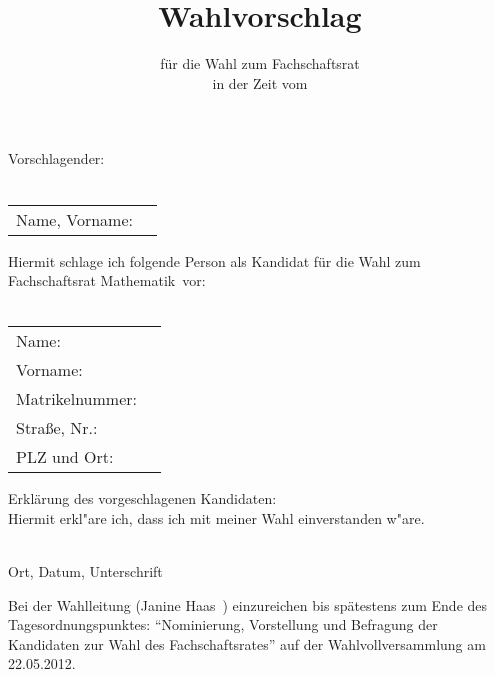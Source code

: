 \documentclass[a4paper,10pt]{scrartcl}
\title{Wahlvorschlag}
\subtitle{für die Wahl zum Fachschaftsrat \fach \\ in der Zeit vom \zeit}
\date{}
\def\fach{Mathematik}
\def\wahlvvDatum{22.05.2012}
\def\wahlleiter{Janine Haas~}
\begin{document}
\pagestyle{empty}
\thispagestyle{empty}
\renewcommand{\titlepagestyle}{empty}

\maketitle

Vorschlagender:
\\
\vspace{0.5cm}\\
\begin{tabularx}{\textwidth}{lX}
Name, Vorname: & \underline{\hspace{10cm}} \vspace{0.5cm}\\
\end{tabularx}
Hiermit schlage ich folgende Person als Kandidat für die Wahl zum Fachschaftsrat \fach~vor:\\
\vspace{0.5cm}\\
\begin{tabularx}{\textwidth}{lX}
Name: & \underline{\hspace{10cm}} \vspace{0.5cm}\\
Vorname:  & \underline{\hspace{10cm}} \vspace{0.5cm}\\
Matrikelnummer: & \underline{\hspace{10cm}} \vspace{0.5cm}\\ 
Straße, Nr.:  & \underline{\hspace{10cm}} \vspace{0.5cm}\\
PLZ und Ort: & \underline{\hspace{10cm}} \vspace{0.5cm}\\
\end{tabularx}          
Erklärung des vorgeschlagenen Kandidaten:\\
Hiermit erkl"are ich, dass ich mit meiner Wahl einverstanden w"are.
\vspace{0.5cm}

\underline{\hspace{10cm}}\\
Ort, Datum, Unterschrift

Bei der Wahlleitung (\wahlleiter) einzureichen bis spätestens zum Ende des Tagesordnungspunktes:
``Nominierung, Vorstellung und Befragung der Kandidaten zur Wahl des Fachschaftsrates'' auf
der Wahlvollversammlung am \wahlvvDatum.
\end{document}
